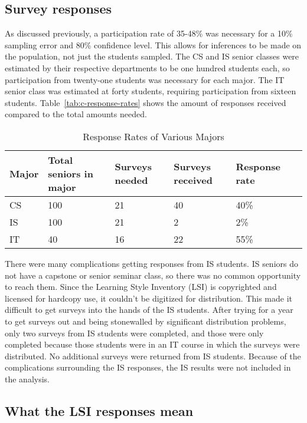 \subsection{Survey responses}
As discussed previously, a participation rate of 35-48\% was necessary for a 10\% sampling error and 80\% confidence level. This allows for inferences to be made on the population, not just the students sampled. The CS and IS senior classes were estimated by their respective departments to be one hundred students each, so participation from twenty-one students was necessary for each major. The IT senior class was estimated at forty students, requiring participation from sixteen students. Table~\ref{tab:c-response-rates} shows the amount of responses received compared to the total amounts needed.

\begin{table}[h!]
  \centering
  \caption{Response Rates of Various Majors}
  \label{tab:response-rates}
  \begin{tabular}{llllll}
    \toprule
    Major & Total seniors in major & Surveys needed & Surveys received & Response rate\\
    \midrule
    CS    & 100                    & 21             & 40               & 40\%\\
    IS    & 100                    & 21             & 2                & 2\%\\
    IT    & 40                     & 16             & 22               & 55\%\\
    \bottomrule
  \end{tabular}
\end{table}

There were many complications getting responses from IS students. IS seniors do not have a capstone or senior seminar class, so there was no common opportunity to reach them. Since the Learning Style Inventory (LSI) is copyrighted and licensed for hardcopy use, it couldn't be digitized for distribution. This made it difficult to get surveys into the hands of the IS students. After trying for a year to get surveys out and being stonewalled by significant distribution problems, only two surveys from IS students were completed, and those were only completed because those students were in an IT course in which the surveys were distributed. No additional surveys were returned from IS students. Because of the complications surrounding the IS responses, the IS results were not included in the analysis.

\subsection{What the LSI responses mean}
